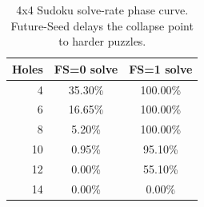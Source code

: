 \begin{table}[t]
\centering
\small
\caption{4x4 Sudoku solve-rate phase curve. Future-Seed delays the collapse point to harder puzzles.}
\label{tab:appendix-sudoku-phase}
\begin{tabular}{rcc}
\toprule
Holes & FS=0 solve & FS=1 solve \\
\midrule
4 & 35.30\% & 100.00\% \\
6 & 16.65\% & 100.00\% \\
8 & 5.20\% & 100.00\% \\
10 & 0.95\% & 95.10\% \\
12 & 0.00\% & 55.10\% \\
14 & 0.00\% & 0.00\% \\
\bottomrule
\end{tabular}
\end{table}
